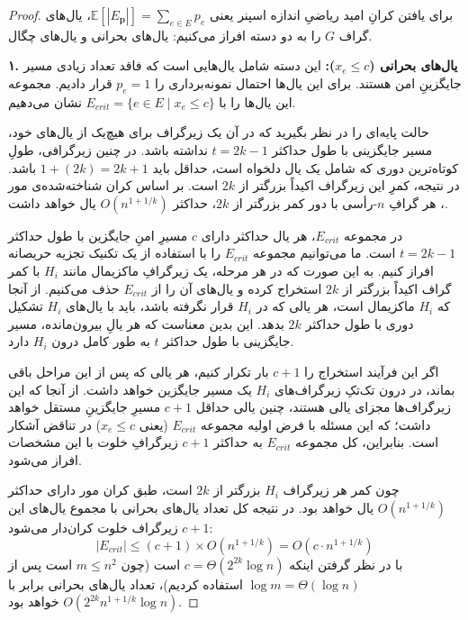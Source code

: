\documentclass[11pt,a4paper]{report}
\theoremstyle{plain}
\theoremstyle{definition}
\theoremstyle{remark}
\begin{document}
\begin{proof}
برای یافتن کرانِ امید ریاضیِ اندازه اسپنر یعنی $\mathbb{E}[|E_{\mathbf{p}}|] = \sum_{e \in E} p_e$، یال‌های گراف $G$ را به دو دسته افراز می‌کنیم: یال‌های بحرانی و یال‌های چگال.

\textbf{۱. یال‌های بحرانی ($x_e \le c$):}
این دسته شامل یال‌هایی است که فاقد تعداد زیادی مسیر جایگزینِ امن هستند. برای این یال‌ها احتمال نمونه‌برداری را $p_e = 1$ قرار دادیم. مجموعه این یال‌ها را با $E_{crit} = \{e \in E \mid x_e \le c\}$ نشان می‌دهیم.

حالت پایه‌ای را در نظر بگیرید که در آن یک زیرگراف برای هیچ‌یک از یال‌های خود، مسیر جایگزینی با طول حداکثر $t = 2k-1$ نداشته باشد. در چنین زیرگرافی، طولِ کوتاه‌ترین دوری که شامل یک یال دلخواه است، حداقل باید $1 + (2k) = 2k+1$ باشد. در نتیجه، کمرِ این زیرگراف اکیداً بزرگتر از $2k$ است. بر اساس کران شناخته‌شده‌ی مور \cite{alon2002moore}، هر گرافِ $n$-رأسی با دور کمر بزرگتر از $2k$، حداکثر $O(n^{1+1/k})$ یال خواهد داشت.

در مجموعه $E_{crit}$، هر یال حداکثر دارای $c$ مسیرِ امنِ جایگزین با طول حداکثر $t = 2k-1$ است. ما می‌توانیم مجموعه $E_{crit}$ را با استفاده از یک تکنیک تجزیه حریصانه \cite{althofer1993sparse} افراز کنیم. به این صورت که در هر مرحله، یک زیرگرافِ ماکزیمال مانند $H_i$ با کمر گراف اکیداً بزرگتر از $2k$ استخراج کرده و یال‌های آن را از $E_{crit}$ حذف می‌کنیم. از آنجا که $H_i$ ماکزیمال است، هر یالی که در $H_i$ قرار نگرفته باشد، باید با یال‌های $H_i$ تشکیل دوری با طول حداکثر $2k$ بدهد. این بدین معناست که هر یالِ بیرون‌مانده، مسیر جایگزینی با طول حداکثر $t$ به طور کامل درون $H_i$ دارد.

اگر این فرآیند استخراج را $c+1$ بار تکرار کنیم، هر یالی که پس از این مراحل باقی بماند، در درون تک‌تکِ زیرگراف‌های $H_i$ یک مسیر جایگزین خواهد داشت. از آنجا که این زیرگراف‌ها مجزای یالی هستند، چنین یالی حداقل $c+1$ مسیرِ جایگزینِ مستقل خواهد داشت؛ که این مسئله با فرض اولیه مجموعه $E_{crit}$ (یعنی $x_e \le c$) در تناقض آشکار است. بنابراین، کل مجموعه $E_{crit}$ به حداکثر $c+1$ زیرگرافِ خلوت با این مشخصات افراز می‌شود.

چون کمر هر زیرگراف $H_i$ بزرگتر از $2k$ است، طبق کران مور دارای حداکثر $O(n^{1+1/k})$ یال خواهد بود. در نتیجه کل تعداد یال‌های بحرانی با مجموع یال‌های این $c+1$ زیرگراف خلوت کران‌دار می‌شود:
\[
|E_{crit}| \le (c+1) \times O(n^{1+1/k}) = O(c \cdot n^{1+1/k})
\]
با در نظر گرفتن اینکه $c = \Theta(2^{2k} \log n)$ است (چون $m \le n^2$ است پس از $\log m = \Theta(\log n)$ استفاده کردیم)، تعداد یال‌های بحرانی برابر با $O(2^{2k} n^{1+1/k} \log n)$ خواهد بود.


\end{proof}
\end{document}

